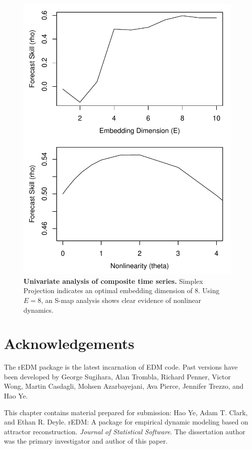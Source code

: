 \begin{figure}[!ht]
\begin{center}\includegraphics[width=\maxwidth{\textwidth}]{fig_redm_17.pdf}\end{center}
\caption[Univariate analysis of composite time series.]{\textbf{Univariate analysis of composite time series.}\newline
Simplex Projection indicates an optimal embedding dimension of 8. Using $E = 8$, an S-map analysis shows clear evidence of nonlinear dynamics.}
\end{figure}

\section{Acknowledgements}
The rEDM package is the latest incarnation of EDM code. Past versions have been developed by George Sugihara, Alan Trombla, Richard Penner, Victor Wong, Martin Casdagli, Mohsen Azarbayejani, Ava Pierce, Jennifer Trezzo, and Hao Ye.

This chapter contains material prepared for submission: Hao Ye, Adam T. Clark, and Ethan R. Deyle. rEDM: A package for empirical dynamic modeling based on attractor reconstruction. \emph{Journal of Statistical Software}. The dissertation author was the primary investigator and author of this paper.
